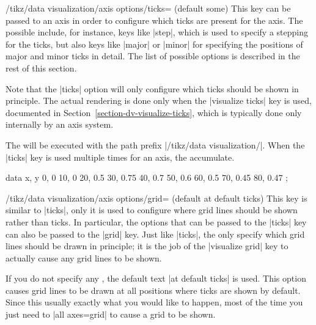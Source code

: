 \begin{key}{/tikz/data visualization/axis options/ticks= (default some)}
    This key can be passed to an axis in order to configure which ticks are
    present for the axis. The possible  include, for instance,
    keys like |step|, which is used to specify a stepping for the ticks, but
    also keys like |major| or |minor| for specifying the positions of major and
    minor ticks in detail. The list of possible options is described in the
    rest of this section.

    Note that the |ticks| option will only configure which ticks should be
    shown in principle. The actual rendering is done only when the
    |visualize ticks| key is used, documented in
    Section~\ref{section-dv-visualize-ticks}, which is typically done only
    internally by an axis system.

    The  will be executed with the path prefix
    |/tikz/data visualization/|. When the |ticks| key is used multiple times
    for an axis, the  accumulate.
\begin{codeexample}[width=6cm,preamble={\usetikzlibrary{datavisualization}}]
\tikz \datavisualization [
  scientific axes, visualize as line,
  x axis={ticks={step=24, minor steps between steps=3},
          label=hours}]
  data {
    x, y
    0, 0
    10, 0
    20, 0.5
    30, 0.75
    40, 0.7
    50, 0.6
    60, 0.5
    70, 0.45
    80, 0.47
  };
\end{codeexample}
\end{key}

\begin{key}{/tikz/data visualization/axis options/grid= (default at default ticks)}
    This key is similar to |ticks|, only it is used to configure where grid
    lines should be shown rather than ticks. In particular, the options that
    can be passed to the |ticks| key can also be passed to the |grid| key. Just
    like |ticks|, the  only specify which grid lines should be
    drawn in principle; it is the job of the |visualize grid| key to actually
    cause any grid lines to be shown.

    If you do not specify any , the default text
    |at default ticks| is used. This option causes grid lines to be drawn at
    all positions where ticks are shown by default. Since this usually exactly
    what you would like to happen, most of the time you just need to
    |all axes=grid| to cause a grid to be shown.
\end{key}

